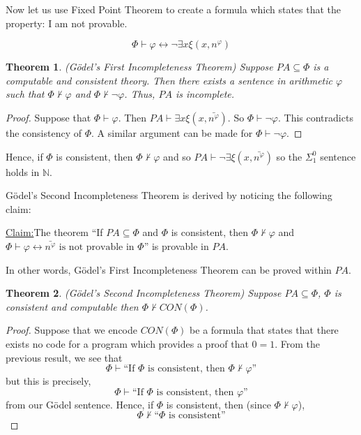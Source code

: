\documentclass[a4paper,10pt]{article}
\newenvironment{claim}[1]{\par\noindent\underline{Claim:}\space#1}{}
\newtheorem{theorem}{Theorem}[section]
\let\phi\varphi
\newcommand*\NN{\mathbb{N}}
\newcommand*\n{\newline\par}
\newcommand*\phibar{\bar{n^{\phi}}}
\newcommand*\prf{\vdash}
\newcommand*\biject{\leftrightarrow}
\begin{document}
  
  Now let us use Fixed Point Theorem to create a formula which states that the property: I am not provable.
  
  \begin{equation*}
   \Phi \prf \phi \biject \neg\exists x \xi(x,n^{\phi})
  \end{equation*}
  
  \begin{theorem}
  (G\"{o}del's First Incompleteness Theorem)
  Suppose $PA \subseteq \Phi$ is a computable and consistent theory. Then there exists a sentence in arithmetic $\phi$ such that $\Phi \not\prf \phi$ and $\Phi \not\prf \neg\phi$. Thus, $PA$ is incomplete.
  \end{theorem}


  \begin{proof}
   Suppose that $\Phi \prf \phi$. Then $PA \prf \exists x\xi(x,\phibar)$. So $\Phi \prf \neg\phi$. This contradicts the consistency of $\Phi$. A similar argument can be made for $\Phi \prf \neg\phi$.
  \end{proof} 
  
  Hence, if $\Phi$ is consistent, then $\Phi \not\prf \phi$ and so $PA \prf \neg\exists\xi(x,\phibar)$ so the $\Sigma_1^0$ sentence holds in $\NN$. \n

  G\"{o}del's Second Incompleteness Theorem is derived by noticing the following claim: \n
  
  \begin{claim}
    The theorem ``If $PA \subseteq \Phi$ and $\Phi$ is consistent, then $\Phi \not\prf \phi$ and $\Phi \prf \phi \biject \text{$\phibar$ is not provable in $\Phi$}$'' is provable in $PA$. 
  \end{claim} \n
  
  In other words, G\"{o}del's First Incompleteness Theorem can be proved within $PA$.
  
  \begin{theorem}
   (G\"{o}del's Second Incompleteness Theorem)
   Suppose $PA \subseteq \Phi$, $\Phi$ is consistent and computable then $\Phi \not\prf CON(\Phi)$.
  \end{theorem}

  \begin{proof}
   Suppose that we encode $CON(\Phi)$ be a formula that states that there exists no code for a program which provides a proof that $0=1$.
   From the previous result, we see that 
   \begin{equation*}
    \Phi \prf \text{``If $\Phi$ is consistent, then $\Phi \not\prf \phi$''}
   \end{equation*}
   but this is precisely,
   \begin{equation*}
    \Phi \prf \text{``If $\Phi$ is consistent, then $\phi$''}
   \end{equation*}
   from our G\"{o}del sentence.
   Hence, if $\Phi$ is consistent, then (since $\Phi \not\prf \phi$), 
      \begin{equation*}
    \Phi \not\prf \text{``$\Phi$ is consistent''}
   \end{equation*}
  \end{proof}
  
\end{document}
